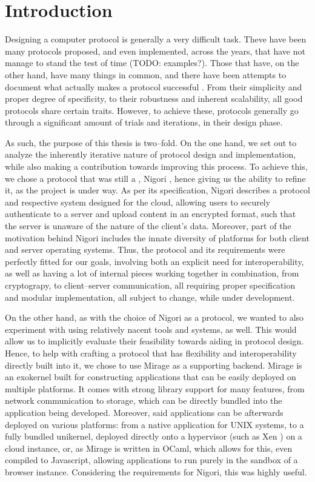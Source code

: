 \chapter{Introduction} \label{chapter:introduction}
\setcounter{page}{1}

Designing a computer protocol is generally a very difficult task.
Theve have been many protocols proposed, and even implemented, across the years, that have not manage to stand the test of time (TODO: examples?).
Those that have, on the other hand, have many things in common, and there have been attempts to document what actually makes a protocol successful \cite{RFC5218}.
From their simplicity and proper degree of specificity, to their robustness and inherent scalability, all good protocols share certain traits.
However, to achieve these, protocols generally go through a significant amount of trials and iterations, in their design phase.

As such, the purpose of this thesis is two--fold.
On the one hand, we set out to analyze the inherently iterative nature of protocol design and implementation, while also making a contribution towards improving this process.
To achieve this, we chose a protocol that was still a \wip, Nigori \cite{NigoriDraft}, hence giving us the ability to refine it, as the project is under way.
As per its specification, Nigori describes a protocol and respective system designed for the cloud, allowing users to securely authenticate to a server and upload content in an encrypted format, such that the server is unaware of the nature of the client's data.
Moreover, part of the motivation behind Nigori includes the innate diversity of platforms for both client and server operating systems.
Thus, the protocol and its requirements were perfectly fitted for our goals, involving both an explicit need for interoperability, as well as having a lot of internal pieces working together in combination, from cryptograpy, to client--server communication, all requiring proper specification and modular implementation, all subject to change, while under development.

On the other hand, as with the choice of Nigori as a protocol, we wanted to also experiment with using relatively nacent tools and systems, as well.
This would allow us to implicitly evaluate their feasibility towards aiding in protocol design.
Hence, to help with crafting a protocol that has flexibility and interoperability directly built into it, we chose to use Mirage \cite{Mirage} as a supporting backend.
Mirage is an exokernel built for constructing applications that can be easily deployed on multiple platforms.
It comes with strong library support for many features, from network communication to storage, which can be directly bundled into the application being developed.
Moreover, said applications can be afterwards deployed on various platforms: from a native application for UNIX systems, to a fully bundled unikernel, deployed directly onto a hypervisor (such as Xen \cite{Xen}) on a cloud instance, or, as Mirage is written in OCaml, which allows for this, even compiled to Javascript, allowing applications to run purely in the sandbox of a browser instance.
Considering the requirements for Nigori, this was highly useful.

